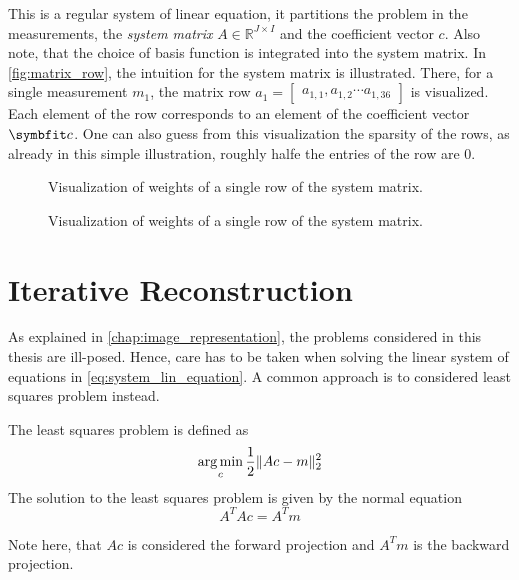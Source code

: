 This is a regular system of linear equation, it partitions the problem in the measurements, the
\textit{system matrix} \(A \in \mathbb{R}^{J \times I}\) and the coefficient vector \(c\). Also
note, that the choice of basis function is integrated into the system matrix. In
\autoref{fig:matrix_row}, the intuition for the system matrix is illustrated. There, for a single
measurement \(m_1\), the matrix row \(a_{1} = \begin{bmatrix}a_{1, 1}, a_{1, 2} \cdots
	a_{1,36}\end{bmatrix}\) is visualized. Each element of the row corresponds to an element of the
coefficient vector \(\mvec{c}\). One can also guess from this visualization the sparsity of the
rows, as already in this simple illustration, roughly halfe the entries of the row are \(0\).

\begin{figure}
	\centering
	
	\caption{Visualization of weights of a single row of the system matrix. }\label{fig:matrix_row}
\end{figure}

\begin{figure}
	\centering
	
	\caption{Visualization of weights of a single row of the system matrix.}\label{fig:matrix_row}
\end{figure}

\section{Iterative Reconstruction}\label{sec:iterative_reconstruction}

As explained in \autoref{chap:image_representation}, the problems considered in this thesis are
ill-posed. Hence, care has to be taken when solving the linear system of equations in
\autoref{eq:system_lin_equation}. A common approach is to considered least squares problem instead.

\begin{definition}\label{def:least_squares_problem}
	The least squares problem is defined as
	\[ \operatorname*{arg\,min}_c \frac{1}{2} \lVert Ac - m\rVert^2_2 \]
	The solution to the least squares problem is given by the normal equation
	\[ A^T A c = A^T m \]
\end{definition}

Note here, that \(Ac\) is considered the forward projection and \(A^T m\) is the backward
projection.

